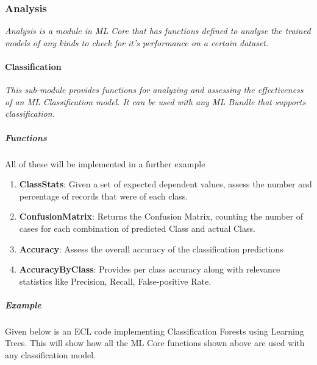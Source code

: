 \documentclass[a4paper,oneside,12pt]{book}
\begin{document}
\subsubsection{Analysis}\label{mlcore:analysis}

\textit{Analysis is a module in ML Core that has functions defined to analyse the trained models of any kinds to check for it's performance on a certain dataset. }

\paragraph{Classification}\label{analysis:classification}

\textit{This sub-module provides functions for analyzing and assessing the effectiveness of an ML Classification model. It can be used with any ML Bundle that supports classification.}

\subparagraph{Functions}

All of these will be implemented in a further example

\begin{enumerate}
    \item \textbf{ClassStats}: Given a set of expected dependent values, assess the number and percentage of records that were of each class.
    \item \textbf{ConfusionMatrix}: Returns the Confusion Matrix, counting the number of cases for each combination of predicted Class and actual Class.
    \item \textbf{Accuracy}: Assess the overall accuracy of the classification predictions
    \item \textbf{AccuracyByClass}: Provides per class accuracy along with relevance statistics like Precision, Recall, False-positive Rate.
\end{enumerate}

\subparagraph{Example}\label{classification:example}

Given below is an ECL code implementing Classification Forests using Learning Trees. This will show how all the ML Core functions shown above are used with any classification model.
\end{document}
